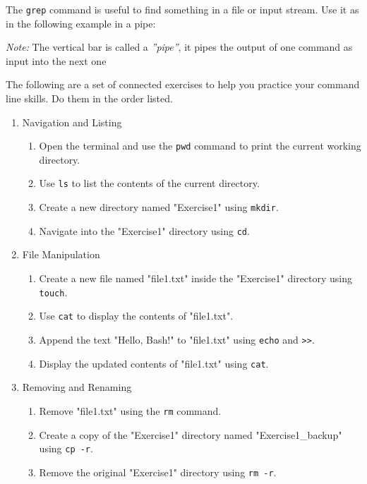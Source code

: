 \noindent The \texttt{grep} command is useful to find something in a file or input stream. Use it as in the following example in a pipe:

\noindent \emph{Note:} The vertical bar is called a \emph{''pipe''}, it pipes the output of one command as input into the next one

The following are a set of connected exercises to help you practice your command line skills. Do them in the order listed.

\begin{exerciseboxcomputer}

\begin{enumerate}
\item Navigation and Listing
\begin{enumerate}[nosep]
	\item Open the terminal and use the \texttt{pwd} command to print the current working directory.
	\item Use \texttt{ls} to list the contents of the current directory.
	\item Create a new directory named "Exercise1" using \texttt{mkdir}.
	\item Navigate into the "Exercise1" directory using \texttt{cd}.
\end{enumerate}
\item File Manipulation
\begin{enumerate}
	\item Create a new file named "file1.txt" inside the "Exercise1" directory using \texttt{touch}.
	\item Use \texttt{cat} to display the contents of "file1.txt".
	\item Append the text "Hello, Bash!" to "file1.txt" using \texttt{echo} and \texttt{>>}.
	\item Display the updated contents of "file1.txt" using \texttt{cat}.
\end{enumerate}
\item Removing and Renaming
\begin{enumerate}
	\item Remove "file1.txt" using the \texttt{rm} command.
	\item Create a copy of the "Exercise1" directory named "Exercise1\_backup" using \texttt{cp -r}.
	\item Remove the original "Exercise1" directory using \texttt{rm -r}.

\end{enumerate}
\end{enumerate}
\end{exerciseboxcomputer}
